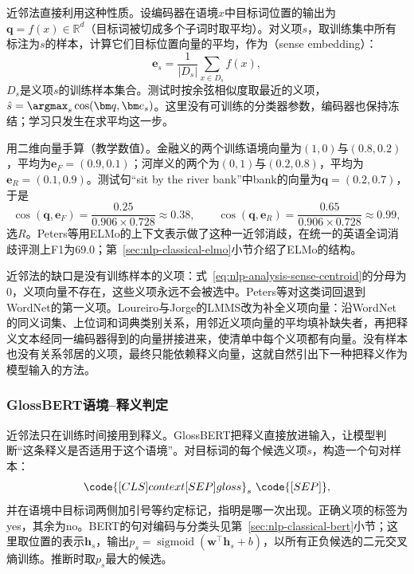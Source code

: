 近邻法直接利用这种性质。设编码器在语境$x$中目标词位置的输出为$\bm q=f(x)\in\mathbb R^d$（目标词被切成多个子词时取平均）。对义项$s$，取训练集中所有标注为$s$的样本，计算它们目标位置向量的平均，作为（sense embedding）：
\begin{equation}
 \bm e_s=\frac{1}{|D_s|}\sum_{x\in D_s}f(x),
 \label{eq:nlp-analysis-sense-centroid}
\end{equation}
$D_s$是义项$s$的训练样本集合。测试时按余弦相似度取最近的义项，$\hat s=\argmax_{s}\cos(\bm q,\bm e_s)$。这里没有可训练的分类器参数，编码器也保持冻结；学习只发生在求平均这一步。

用二维向量手算（教学数值）。金融义的两个训练语境向量为$(1,0)$与$(0.8,0.2)$，平均为$\bm e_F=(0.9,0.1)$；河岸义的两个为$(0,1)$与$(0.2,0.8)$，平均为$\bm e_R=(0.1,0.9)$。测试句“sit by the river bank”中bank的向量为$\bm q=(0.2,0.7)$，于是
\[
 \cos(\bm q,\bm e_F)=\frac{0.25}{0.906\times0.728}\approx0.38,\qquad
 \cos(\bm q,\bm e_R)=\frac{0.65}{0.906\times0.728}\approx0.99,
\]
选$R$。Peters等用ELMo的上下文表示做了这种一近邻消歧，在统一的英语全词消歧评测上F1为69.0\cite{nlp-classical-peters2018}；第~\ref{sec:nlp-classical-elmo}小节介绍了ELMo的结构。

近邻法的缺口是没有训练样本的义项：式~\eqref{eq:nlp-analysis-sense-centroid}的分母为0，义项向量不存在，这些义项永远不会被选中。Peters等对这类词回退到WordNet的第一义项。Loureiro与Jorge的LMMS改为补全义项向量：沿WordNet的同义词集、上位词和词典类别关系，用邻近义项向量的平均填补缺失者，再把释义文本经同一编码器得到的向量拼接进来，使清单中每个义项都有向量。没有样本也没有关系邻居的义项，最终只能依赖释义向量，这就自然引出下一种把释义作为模型输入的方法。

\subsubsection{GlossBERT语境--释义判定}
\label{sec:nlp-analysis-glossbert}

近邻法只在训练时间接用到释义。GlossBERT把释义直接放进输入，让模型判断“这条释义是否适用于这个语境”。对目标词的每个候选义项$s$，构造一个句对样本：
\[
 \code{[CLS] context [SEP] gloss}_s\ \code{[SEP]},
\]
并在语境中目标词两侧加引号等约定标记，指明是哪一次出现。正确义项的标签为yes，其余为no。BERT的句对编码与分类头见第~\ref{sec:nlp-classical-bert}小节；这里取\code{[CLS]}位置的表示$\bm h_s$，输出$p_s=\operatorname{sigmoid}(\bm w^{\top}\bm h_s+b)$，以所有正负候选的二元交叉熵训练。推断时取$p_s$最大的候选。

